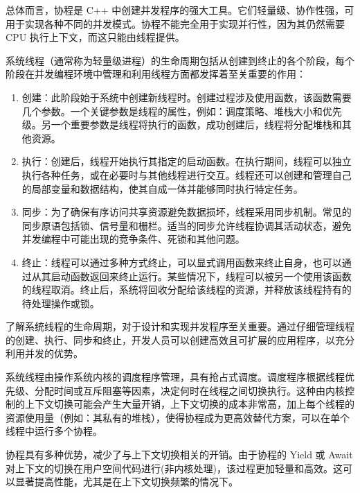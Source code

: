 总体而言，协程是 C++ 中创建并发程序的强大工具。它们轻量级、协作性强，可用于实现各种不同的并发模式。协程不能完全用于实现并行性，因为其仍然需要 CPU 执行上下文，而这只能由线程提供。


系统线程（通常称为轻量级进程）的生命周期包括从创建到终止的各个阶段，每个阶段在并发编程环境中管理和利用线程方面都发挥着至关重要的作用：

\begin{enumerate}
\item
创建：此阶段始于系统中创建新线程时。创建过程涉及使用函数，该函数需要几个参数。一个关键参数是线程的属性，例如：调度策略、堆栈大小和优先级。另一个重要参数是线程将执行的函数，成功创建后，线程将分配堆栈和其他资源。

\item
执行：创建后，线程开始执行其指定的启动函数。在执行期间，线程可以独立执行各种任务，或在必要时与其他线程进行交互。线程还可以创建和管理自己的局部变量和数据结构，使其自成一体并能够同时执行特定任务。

\item
同步：为了确保有序访问共享资源避免数据损坏，线程采用同步机制。常见的同步原语包括锁、信号量和栅栏。适当的同步允许线程协调其活动状态，避免并发编程中可能出现的竞争条件、死锁和其他问题。

\item
终止：线程可以通过多种方式终止，可以显式调用函数来终止自身，也可以通过从其启动函数返回来终止运行。某些情况下，线程可以被另一个使用该函数的线程取消。终止后，系统将回收分配给该线程的资源，并释放该线程持有的待处理操作或锁。
\end{enumerate}

了解系统线程的生命周期，对于设计和实现并发程序至关重要。通过仔细管理线程的创建、执行、同步和终止，开发人员可以创建高效且可扩展的应用程序，以充分利用并发的优势。


系统线程由操作系统内核的调度程序管理，具有抢占式调度。调度程序根据线程优先级、分配时间或互斥阻塞等因素，决定何时在线程之间切换执行。这种由内核控制的上下文切换可能会产生大量开销，上下文切换的成本非常高，加上每个线程的资源使用量（例如：其私有的堆栈），使得协程成为更高效替代方案，可以在单个线程中运行多个协程。

协程具有多种优势，减少了与上下文切换相关的开销。由于协程的 Yield 或 Await 对上下文的切换在用户空间代码进行(非内核处理)，该过程更加轻量和高效。这可以显著提高性能，尤其是在上下文切换频繁的情况下。

